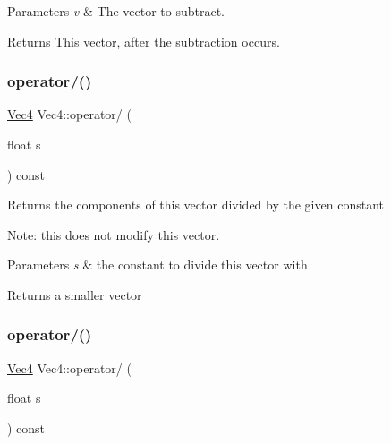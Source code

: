 \begin{DoxyParams}{Parameters}
{\em v} & The vector to subtract. \\
\hline
\end{DoxyParams}
\begin{DoxyReturn}{Returns}
This vector, after the subtraction occurs. 
\end{DoxyReturn}
\mbox{\label{classVec4_a01bf1811f01aaf89eb1b653188ea1a08}} 
\subsubsection{\texorpdfstring{operator/()}{operator/()}\hspace{0.1cm}{\footnotesize\ttfamily [1/2]}}
{\footnotesize\ttfamily \hyperlink{classVec4}{Vec4} Vec4\+::operator/ (\begin{DoxyParamCaption}\item[{float}]{s }\end{DoxyParamCaption}) const\hspace{0.3cm}{\ttfamily [inline]}}

Returns the components of this vector divided by the given constant

Note\+: this does not modify this vector.


\begin{DoxyParams}{Parameters}
{\em s} & the constant to divide this vector with \\
\hline
\end{DoxyParams}
\begin{DoxyReturn}{Returns}
a smaller vector 
\end{DoxyReturn}
\mbox{\label{classVec4_a01bf1811f01aaf89eb1b653188ea1a08}} 
\subsubsection{\texorpdfstring{operator/()}{operator/()}\hspace{0.1cm}{\footnotesize\ttfamily [2/2]}}
{\footnotesize\ttfamily \hyperlink{classVec4}{Vec4} Vec4\+::operator/ (\begin{DoxyParamCaption}\item[{float}]{s }\end{DoxyParamCaption}) const\hspace{0.3cm}{\ttfamily [inline]}}

